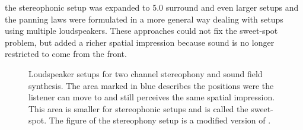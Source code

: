  the stereophonic setup was expanded to 5.0 surround
and even larger setups and the panning laws were
formulated in a more general way dealing with setups using multiple
loudspeakers.
These approaches could not fix the sweet-spot problem, but added a richer
spatial impression because sound is no longer restricted to come from the front.
%
\begin{figure}[t]
    \centering
    \small
    \caption{Loudspeaker setups for two channel stereophony
    and sound field synthesis. The area marked in blue describes the positions were the
    listener can move to and still perceives the same spatial impression. This
    area is smaller for stereophonic setups and is called the
    sweet-spot. The figure of the stereophony setup is a modified version of
    \cite[][Fig.\,1.1]{Ahrens2012}.
    }
    \label{fig:stereophony}
\end{figure}

